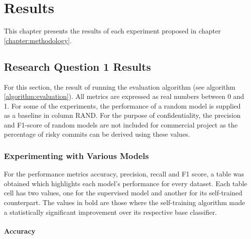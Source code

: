 \documentclass[../main.tex]{subfiles}
\begin{document}
\chapter{Results} \label{chapter:results}

This chapter presents the results of each experiment proposed in chapter \ref{chapter:methodology}. 

\section{Research Question 1 Results}

For this section, the result of running the evaluation algorithm (see algorithm \ref{algorithm:evaluation}). All metrics are expressed as real numbers between 0 and 1. For some of the experiments, the performance of a random model is supplied as a baseline in column RAND. For the purpose of confidentiality, the precision and F1-score of random models are not included for commercial project as the percentage of risky commits can be derived using these values. 

\subsection{Experimenting with Various Models}\label{subsection:experiment1}

For the performance metrics accuracy, precision, recall and F1 score, a table was obtained which highlights each model's performance for every dataset. Each table cell has two values, one for the supervised model and another for its self-trained counterpart. The values in bold are those where the self-training algorithm made a statistically significant improvement over its respective base classifier. 

\subsubsection{Accuracy}
\end{document}

